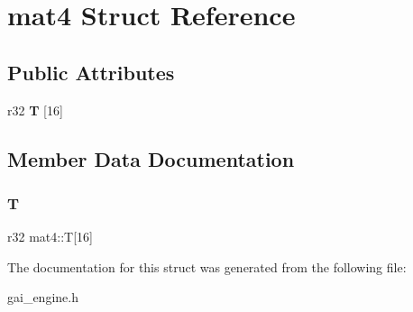 \hypertarget{structmat4}{}\section{mat4 Struct Reference}
\label{structmat4}
\subsection*{Public Attributes}
\begin{DoxyCompactItemize}
\item 
\mbox{\label{structmat4_ad61492e85fcebbb837e4d4874030b060}} 
r32 {\bfseries T} \mbox{[}16\mbox{]}
\end{DoxyCompactItemize}


\subsection{Member Data Documentation}
\mbox{\label{structmat4_ad61492e85fcebbb837e4d4874030b060}} 
\subsubsection{\texorpdfstring{T}{T}}
{\footnotesize\ttfamily r32 mat4\+::T\mbox{[}16\mbox{]}}



The documentation for this struct was generated from the following file\+:\begin{DoxyCompactItemize}
\item 
gai\+\_\+engine.\+h\end{DoxyCompactItemize}
